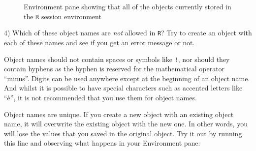 \documentclass[
  letterpaper,
  DIV=11,
  numbers=noendperiod,
  oneside]{scrreprt}
\begin{document}
\begin{figure}


\caption{\label{fig-MultipleObjectsEnvironmentPane}Environment pane
showing that all of the objects currently stored in the \texttt{R}
session environment}

\end{figure}%

\begin{tcolorbox}[enhanced jigsaw, colbacktitle=quarto-callout-tip-color!10!white, colback=white, breakable, colframe=quarto-callout-tip-color-frame, coltitle=black, rightrule=.15mm, left=2mm, leftrule=.75mm, bottomrule=.15mm, titlerule=0mm, toptitle=1mm, arc=.35mm, title=\textcolor{quarto-callout-tip-color}{\faLightbulb}\hspace{0.5em}{Quiz time!}, opacitybacktitle=0.6, bottomtitle=1mm, toprule=.15mm, opacityback=0]

4) Which of these object names are \emph{not} allowed in \texttt{R}? Try
to create an object with each of these names and see if you get an error
message or not.

\end{tcolorbox}

Object names should not contain spaces or symbols like \texttt{!}, nor
should they contain hyphens as the hyphen is reserved for the
mathematical operator ``minus''. Digits can be used anywhere except at
the beginning of an object name. And whilst it is possible to have
special characters such as accented letters like ``è'', it is not
recommended that you use them for object names.

Object names are unique. If you create a new object with an existing
object name, it will overwrite the existing object with the new one. In
other words, you will lose the values that you saved in the original
object. Try it out by running this line and observing what happens in
your Environment pane:
\end{document}
